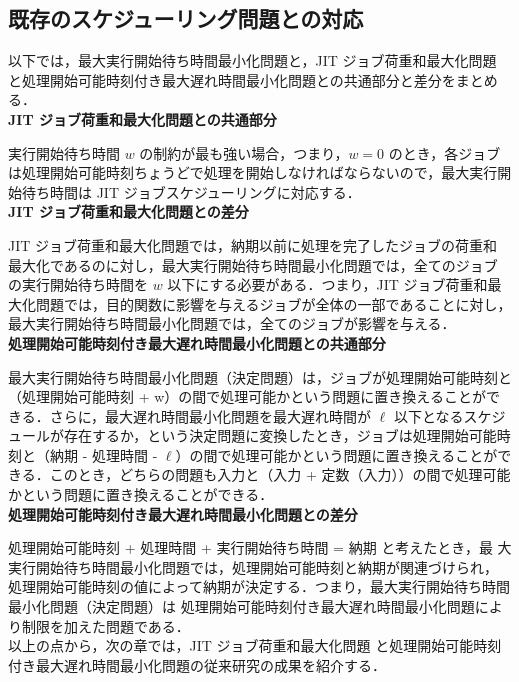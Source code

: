 \documentclass[12pt]{optlab-bachelor}
\begin{document}
\subsection{既存のスケジューリング問題との対応}
以下では，最大実行開始待ち時間最小化問題と，JIT ジョブ荷重和最大化問題
と処理開始可能時刻付き最大遅れ時間最小化問題との共通部分と差分をまとめ
る．\\

\noindent\textbf{JIT ジョブ荷重和最大化問題との共通部分}

実行開始待ち時間 $w$ の制約が最も強い場合，つまり，$w = 0$ のとき，各ジョブは処理開始可能時刻ちょうどで処理を開始しなければならないので，最大実行開始待ち時間は JIT ジョブスケジューリングに対応する．\\

\noindent\textbf{JIT ジョブ荷重和最大化問題との差分}

JIT ジョブ荷重和最大化問題では，納期以前に処理を完了したジョブの荷重和
最大化であるのに対し，最大実行開始待ち時間最小化問題では，全てのジョブ
の実行開始待ち時間を $w$ 以下にする必要がある．つまり，JIT ジョブ荷重和最大化問題では，目的関数に影響を与えるジョブが全体の一部であることに対し，最大実行開始待ち時間最小化問題では，全てのジョブが影響を与える．\\

\noindent\textbf{処理開始可能時刻付き最大遅れ時間最小化問題との共通部分}

最大実行開始待ち時間最小化問題（決定問題）は，ジョブが処理開始可能時刻と（処理開始可能時刻 + w）の間で処理可能かという問題に置き換えることができる．さらに，最大遅れ時間最小化問題を最大遅れ時間が $\ell$ 以下となるスケジュールが存在するか，という決定問題に変換したとき，ジョブは処理開始可能時刻と（納期 - 処理時間 - $\ell$）の間で処理可能かという問題に置き換えることができる．このとき，どちらの問題も入力と（入力 + 定数（入力））の間で処理可能かという問題に置き換えることができる．\\

\noindent\textbf{処理開始可能時刻付き最大遅れ時間最小化問題との差分}

処理開始可能時刻 + 処理時間 + 実行開始待ち時間 = 納期 と考えたとき，最
大実行開始待ち時間最小化問題では，処理開始可能時刻と納期が関連づけられ，
処理開始可能時刻の値によって納期が決定する．つまり，最大実行開始待ち時間最小化問題（決定問題）は
処理開始可能時刻付き最大遅れ時間最小化問題により制限を加えた問題である．\\

以上の点から，次の章では，JIT ジョブ荷重和最大化問題
と処理開始可能時刻付き最大遅れ時間最小化問題の従来研究の成果を紹介する．
\end{document}
